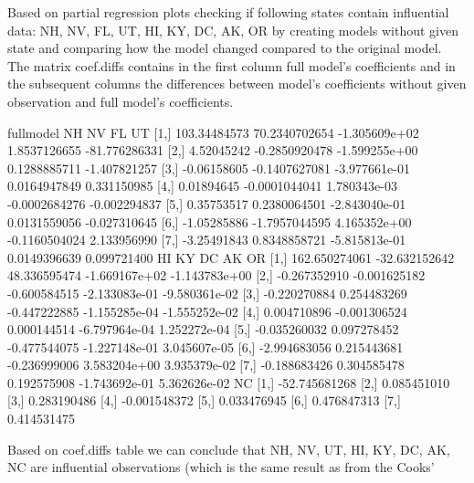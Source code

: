 \documentclass[a4paper]{article}
\begin{document}
\begin{itemize}
Based on partial regression plots checking if following states contain
influential data: NH, NV, FL, UT, HI, KY, DC, AK, OR by creating models without
given state and comparing how the model changed compared to the original model.
The matrix coef.diffs contains in the first column full model's coefficients and
in the subsequent columns the differences between model's coefficients without
given observation and full model's coefficients. 
\begin{Schunk}
\begin{Soutput}
        fullmodel            NH            NV            FL            UT
[1,] 103.34484573 70.2340702654 -1.305609e+02  1.8537126655 -81.776286331
[2,]   4.52045242 -0.2850920478 -1.599255e+00  0.1288885711  -1.407821257
[3,]  -0.06158605 -0.1407627081 -3.977661e-01  0.0164947849   0.331150985
[4,]   0.01894645 -0.0001044041  1.780343e-03 -0.0002684276  -0.002294837
[5,]   0.35753517  0.2380064501 -2.843040e-01  0.0131559056  -0.027310645
[6,]  -1.05285886 -1.7957044595  4.165352e+00 -0.1160504024   2.133956990
[7,]  -3.25491843  0.8348858721 -5.815813e-01  0.0149396639   0.099721400
                HI            KY           DC            AK            OR
[1,] 162.650274061 -32.632152642 48.336595474 -1.669167e+02 -1.143783e+00
[2,]  -0.267352910  -0.001625182 -0.600584515 -2.133083e-01 -9.580361e-02
[3,]  -0.220270884   0.254483269 -0.447222885 -1.155285e-04 -1.555252e-02
[4,]   0.004710896  -0.001306524  0.000144514 -6.797964e-04  1.252272e-04
[5,]  -0.035260032   0.097278452 -0.477544075 -1.227148e-01  3.045607e-05
[6,]  -2.994683056   0.215443681 -0.236999006  3.583204e+00  3.935379e-02
[7,]  -0.188683426   0.304585478  0.192575908 -1.743692e-01  5.362626e-02
                NC
[1,] -52.745681268
[2,]   0.085451010
[3,]   0.283190486
[4,]  -0.001548372
[5,]   0.033476945
[6,]   0.476847313
[7,]   0.414531475
\end{Soutput}
\end{Schunk}
Based on coef.diffs table we can conclude that NH, NV, UT, HI, KY, DC, AK, NC
are influential observations (which is the same result as from the Cooks'

\end{itemize}
\end{document}
